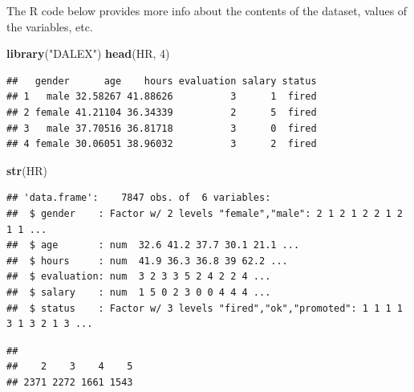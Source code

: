\documentclass[12pt,]{krantz}
\newenvironment{Shaded}{\begin{snugshade}}{\end{snugshade}}
\newcommand{\DecValTok}[1]{\textcolor[rgb]{0.00,0.00,0.81}{#1}}
\newcommand{\KeywordTok}[1]{\textcolor[rgb]{0.13,0.29,0.53}{\textbf{#1}}}
\newcommand{\NormalTok}[1]{#1}
\newcommand{\OperatorTok}[1]{\textcolor[rgb]{0.81,0.36,0.00}{\textbf{#1}}}
\newcommand{\StringTok}[1]{\textcolor[rgb]{0.31,0.60,0.02}{#1}}
\theoremstyle{definition}
\theoremstyle{definition}
\theoremstyle{definition}
\theoremstyle{remark}
\begin{document}
The R code below provides more info about the contents of the dataset,
values of the variables, etc.

\begin{Shaded}
\begin{Highlighting}[]
\KeywordTok{library}\NormalTok{(}\StringTok{"DALEX"}\NormalTok{)}
\KeywordTok{head}\NormalTok{(HR, }\DecValTok{4}\NormalTok{)}
\end{Highlighting}
\end{Shaded}

\begin{verbatim}
##   gender      age    hours evaluation salary status
## 1   male 32.58267 41.88626          3      1  fired
## 2 female 41.21104 36.34339          2      5  fired
## 3   male 37.70516 36.81718          3      0  fired
## 4 female 30.06051 38.96032          3      2  fired
\end{verbatim}

\begin{Shaded}
\begin{Highlighting}[]
\KeywordTok{str}\NormalTok{(HR)}
\end{Highlighting}
\end{Shaded}

\begin{verbatim}
## 'data.frame':    7847 obs. of  6 variables:
##  $ gender    : Factor w/ 2 levels "female","male": 2 1 2 1 2 2 1 2 1 1 ...
##  $ age       : num  32.6 41.2 37.7 30.1 21.1 ...
##  $ hours     : num  41.9 36.3 36.8 39 62.2 ...
##  $ evaluation: num  3 2 3 3 5 2 4 2 2 4 ...
##  $ salary    : num  1 5 0 2 3 0 0 4 4 4 ...
##  $ status    : Factor w/ 3 levels "fired","ok","promoted": 1 1 1 1 3 1 3 2 1 3 ...
\end{verbatim}

\begin{Shaded}
\end{Shaded}

\begin{verbatim}
## 
##    2    3    4    5 
## 2371 2272 1661 1543
\end{verbatim}

\begin{Shaded}
\end{Shaded}
\end{document}
